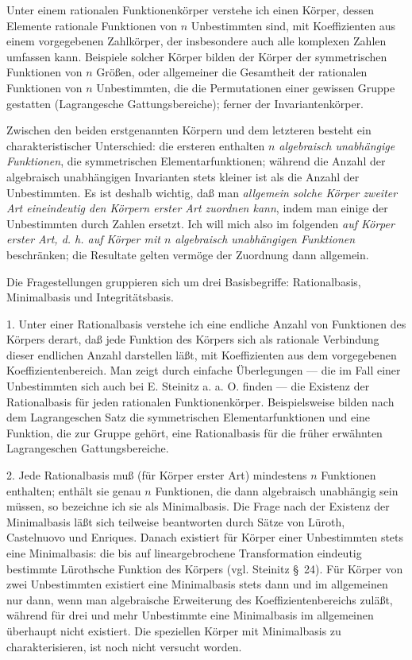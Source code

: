 Unter einem \glqq{}rationalen Funktionenkörper\grqq{} verstehe ich einen Körper, dessen Elemente rationale Funktionen von $n$ Unbestimmten sind, mit Koeffizienten aus einem vorgegebenen Zahlkörper, der insbesondere auch alle komplexen Zahlen umfassen kann. Beispiele solcher Körper bilden der Körper der symmetrischen Funktionen von $n$ Größen, oder allgemeiner die Gesamtheit der rationalen Funktionen von $n$ Unbestimmten, die die Permutationen einer gewissen Gruppe gestatten (Lagrangesche Gattungsbereiche); ferner der Invariantenkörper.

Zwischen den beiden erstgenannten Körpern und dem letzteren besteht ein charakteristischer Unterschied: die ersteren enthalten \emph{$n$ algebraisch unabhängige Funktionen}, die symmetrischen Elementarfunktionen; während die Anzahl der algebraisch unabhängigen Invarianten stets kleiner ist als die Anzahl der Unbestimmten. Es ist deshalb wichtig, daß man \emph{allgemein solche Körper zweiter Art eineindeutig den Körpern erster Art zuordnen kann}, indem man einige der Unbestimmten durch Zahlen ersetzt. Ich will mich also im folgenden \emph{auf Körper erster Art, d. h. auf Körper mit $n$ algebraisch unabhängigen Funktionen} beschränken; die Resultate gelten vermöge der Zuordnung dann allgemein.

Die Fragestellungen gruppieren sich um drei Basisbegriffe: Rationalbasis, Minimalbasis und Integritätsbasis.

1. Unter einer \glqq{}Rationalbasis\grqq{} verstehe ich eine endliche Anzahl von Funktionen des Körpers derart, daß jede Funktion des Körpers sich als rationale Verbindung dieser endlichen Anzahl darstellen läßt, mit Koeffizienten aus dem vorgegebenen Koeffizientenbereich. Man zeigt durch einfache Überlegungen --- die im Fall einer Unbestimmten sich auch bei E. Steinitz a. a. O. finden --- die Existenz der Rationalbasis für jeden rationalen Funktionenkörper. Beispielsweise bilden nach dem Lagrangeschen Satz die symmetrischen Elementarfunktionen und eine Funktion, die zur Gruppe gehört, eine Rationalbasis für die früher erwähnten Lagrangeschen Gattungsbereiche.

2. Jede Rationalbasis muß (für Körper erster Art) mindestens $n$ Funktionen enthalten; enthält sie genau $n$ Funktionen, die dann algebraisch unabhängig sein müssen, so bezeichne ich sie als \glqq{}Minimalbasis\grqq{}. Die Frage nach der Existenz der Minimalbasis läßt sich teilweise beantworten durch Sätze von Lüroth, Castelnuovo und Enriques. Danach existiert für Körper einer Unbestimmten stets eine Minimalbasis: die bis auf lineargebrochene Transformation eindeutig bestimmte Lürothsche Funktion des Körpers (vgl. Steinitz \S\ 24). Für Körper von zwei Unbestimmten existiert eine Minimalbasis stets dann und im allgemeinen nur dann, wenn man algebraische Erweiterung des Koeffizientenbereichs zuläßt, während für drei und mehr Unbestimmte eine Minimalbasis im allgemeinen überhaupt nicht existiert. Die speziellen Körper mit Minimalbasis zu charakterisieren, ist noch nicht versucht worden.

